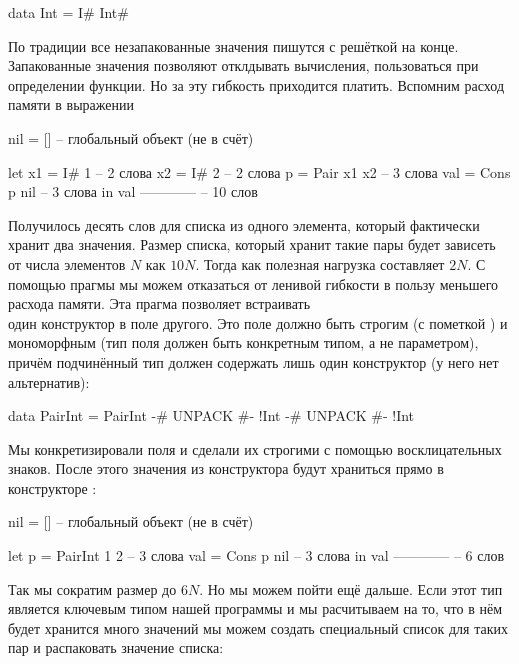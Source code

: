 \begin{code}
data Int = I# Int#
\end{code}

По традиции все незапакованные значения пишутся с решёткой на конце.
Запакованные значения позволяют отклдывать вычисления, пользоваться
 при определении функции. Но за эту гибкость приходится
платить. Вспомним расход памяти в выражении \In{[Pair 1 2]}


\begin{code}
nil = []                 -- глобальный объект (не в счёт)

let x1  = I# 1           -- 2 слова
    x2  = I# 2           -- 2 слова
    p   = Pair x1 x2     -- 3 слова
    val = Cons p nil     -- 3 слова
in  val                  ------------
                         -- 10 слов   
\end{code}

Получилось десять слов для списка из одного элемента, который фактически
хранит два значения. Размер списка, который хранит такие пары будет
зависеть от числа элементов $N$ как $10N$. Тогда как полезная нагрузка
составляет $2N$. С помощью прагмы  мы можем отказаться от
ленивой гибкости в пользу меньшего расхода памяти. Эта прагма позволяет
встраивать\\один конструктор в поле другого. Это поле должно быть
строгим (с пометкой \In{!}) и мономорфным (тип поля должен быть
конкретным типом, а не параметром), причём подчинённый тип должен
содержать лишь один конструктор (у него нет альтернатив):


\begin{code}
data PairInt = PairInt 
    {-# UNPACK #-} !Int
    {-# UNPACK #-} !Int
\end{code}

Мы конкретизировали поля  и сделали их строгими с помощью
восклицательных знаков. После этого значения из конструктора 
будут храниться прямо в конструкторе :


\begin{code}
nil = []                 -- глобальный объект (не в счёт)

let p   = PairInt 1 2    -- 3 слова
    val = Cons p nil     -- 3 слова
in  val                  ------------
                         -- 6 слов   
\end{code}

Так мы сократим размер до $6N$. Но мы можем пойти ещё дальше. Если этот
тип является ключевым типом нашей программы и мы расчитываем на то, что
в нём будет хранится много значений мы можем создать специальный список
для таких пар и распаковать значение списка:


